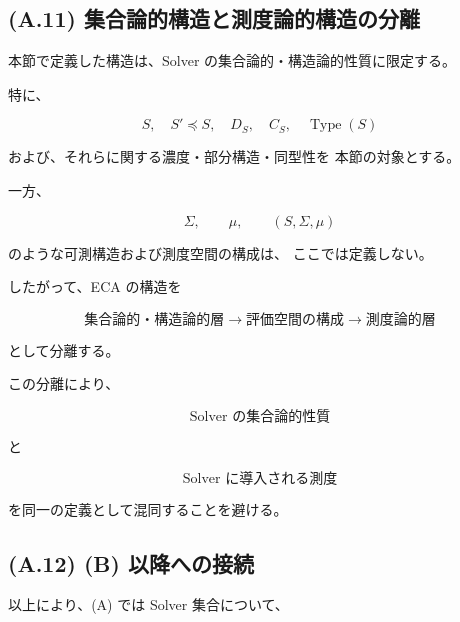 \documentclass[a4paper,11pt]{article}
\newcommand{\SubSolver}{\preceq}
\newcommand{\Type}{\operatorname{Type}}
\begin{document}
\subsection{(A.11) 集合論的構造と測度論的構造の分離}
\label{subsec:A11}

本節で定義した構造は、Solver の集合論的・構造論的性質に限定する。

特に、

\begin{equation}
    S,\quad
    S'\SubSolver S,\quad
    D_S,\quad
    C_S,\quad
    \Type(S)
\end{equation}

および、それらに関する濃度・部分構造・同型性を
本節の対象とする。

一方、

\begin{equation}
    \Sigma,\qquad
    \mu,\qquad
    (S,\Sigma,\mu)
\end{equation}

のような可測構造および測度空間の構成は、
ここでは定義しない。

したがって、ECA の構造を

\begin{equation}
    \boxed{
    \text{集合論的・構造論的層}
    \longrightarrow
    \text{評価空間の構成}
    \longrightarrow
    \text{測度論的層}
    }
    \label{eq:A-layer-separation}
\end{equation}

として分離する。

この分離により、

\begin{equation}
    \text{Solver の集合論的性質}
\end{equation}

と

\begin{equation}
    \text{Solver に導入される測度}
\end{equation}

を同一の定義として混同することを避ける。


\subsection{(A.12) (B) 以降への接続}
\label{subsec:A12}

以上により、(A) では Solver 集合について、
\end{document}
